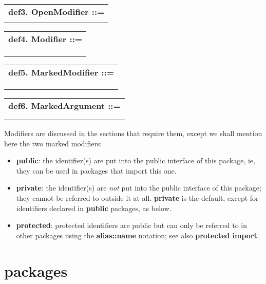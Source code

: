 \documentclass{report}
\begin{document}
\begin{tabular}{l}
{\bf def3. OpenModifier ::= }\\ 
\hspace*{3mm}{\tt MarkedModifier Modifier*} \\ 
\end{tabular}

\begin{tabular}{l}
{\bf def4. Modifier ::= }\\ 
\hspace*{3mm}{\tt MarkedModifier} \\ 
\hspace*{3mm}{\tt  $\mid$ Name {[}(ModArgument){]}} \\ 
\hspace*{3mm}{\tt  $\mid$ "{[}" Modifier** "," "{]}"} \\ 
\end{tabular}

\begin{tabular}{l}
{\bf def5. MarkedModifier ::= }\\ 
\hspace*{3mm}{\tt "public"} \\ 
\hspace*{3mm}{\tt  $\mid$ "private"} \\ 
\hspace*{3mm}{\tt  $\mid$ "protected"} \\ 
\end{tabular}

\begin{tabular}{l}
{\bf def6. MarkedArgument ::= }\\ 
\hspace*{3mm}{\tt Literal} \\ 
\hspace*{3mm}{\tt  $\mid$ "(" Expression ")"} \\ 
\end{tabular}

Modifiers are
discussed in the sections that require them, except we shall mention
here the two marked modifiers:

\begin{itemize}\item {\bf public}: the identifier(s) are put into the public interface of this
package, ie, they can be used in packages that import this one.

\item {\bf private}: the identifier(s) are {\em not} put into the public interface
of this package; they cannot be referred to outside it at all.
{\bf private} is the default, except for identifiers declared in {\bf public}
packages, as below.

\item {\bf protected}: protected identifiers are public but can only be referred to in
other packages using the {\bf alias::name} notation; see also {\bf protected import}.

\end{itemize}\section{packages}
\end{document}
